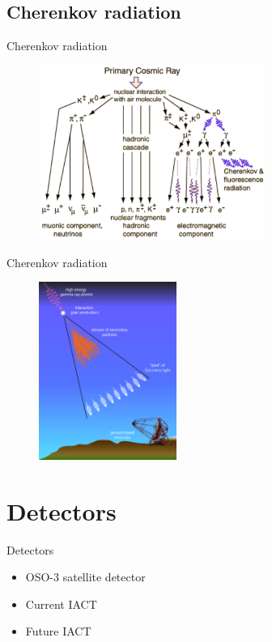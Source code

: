 \documentclass{beamer}
\begin{document}
\subsection{Cherenkov radiation}
\begin{frame}{Cherenkov radiation}
	\begin{figure}[h]
		\includegraphics[width=280px]{cara.png}
	\end{figure}
\end{frame}

\begin{frame}{Cherenkov radiation}
	\begin{figure}[h]
		\includegraphics[width=170px]{atmosphere_cerenkov.png}
	\end{figure}
\end{frame}


\section{Detectors}
\begin{frame}{Detectors}
	\begin{itemize}
		\item OSO-3 satellite detector
		\item Current IACT
		\item Future IACT
	\end{itemize}
\end{frame}
\end{document}
